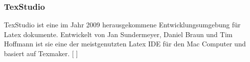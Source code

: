 \documentclass[FIPLY_base.tex]{subfiles}
\begin{document}
	\subsubsection{TexStudio}
	TexStudio ist eine im Jahr 2009 herausgekommene Entwicklungsumgebung für Latex dokumente. Entwickelt von Jan Sundermeyer, Daniel Braun und Tim Hoffmann ist sie eine der meistgenutzten Latex IDE für den Mac Computer und basiert auf Texmaker.
	[ \cite{texstudio}]   
\end{document}

